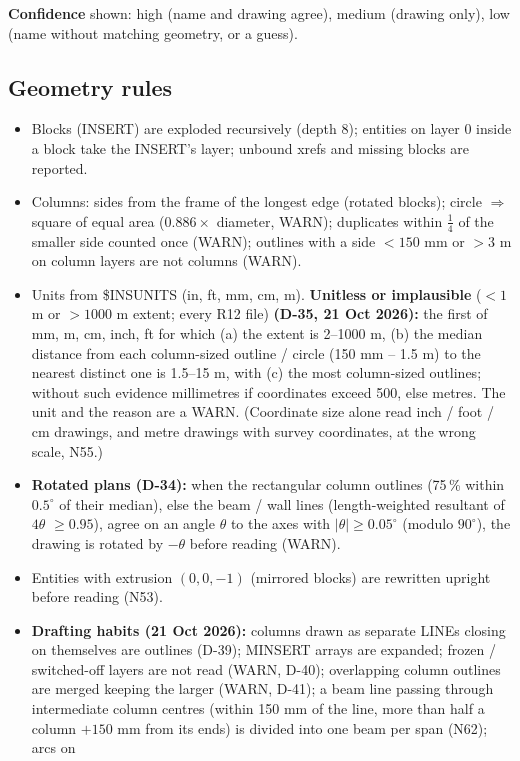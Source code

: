\documentclass[10pt,a4paper]{article}
\begin{document}
\textbf{Confidence} shown: high (name and drawing agree), medium (drawing only), low (name without matching
geometry, or a guess).

\subsection{Geometry rules}
\begin{itemize}
\item Blocks (INSERT) are exploded recursively (depth 8); entities on layer 0 inside a block take the INSERT's layer;
unbound xrefs and missing blocks are reported.
\item Columns: sides from the frame of the longest edge (rotated blocks); circle $\Rightarrow$ square of equal area
($0.886\times$ diameter, WARN); duplicates within $\tfrac14$ of the smaller side counted once (WARN); outlines with a
side $<150$ mm or $>3$ m on column layers are not columns (WARN).
\item Units from \$INSUNITS (in, ft, mm, cm, m). \textbf{Unitless or implausible} ($<1$ m or $>1000$ m extent; every
R12 file) \textbf{(D-35, 21 Oct 2026):} the first of mm, m, cm, inch, ft for which (a) the extent is 2--1000 m,
(b) the median distance from each column-sized outline / circle (150 mm -- 1.5 m) to the nearest distinct one is
1.5--15 m, with (c) the most column-sized outlines; without such evidence millimetres if coordinates exceed 500, else
metres. The unit and the reason are a WARN. (Coordinate size alone read inch / foot / cm drawings, and metre drawings
with survey coordinates, at the wrong scale, N55.)
\item \textbf{Rotated plans (D-34):} when the rectangular column outlines (75\,\% within $0.5^\circ$ of their median),
else the beam / wall lines (length-weighted resultant of $4\theta$ $\ge0.95$), agree on an angle $\theta$ to the axes
with $|\theta|\ge0.05^\circ$ (modulo $90^\circ$), the drawing is rotated by $-\theta$ before reading (WARN).
\item Entities with extrusion $(0,0,-1)$ (mirrored blocks) are rewritten upright before reading (N53).
\item \textbf{Drafting habits (21 Oct 2026):} columns drawn as separate LINEs closing on themselves are outlines
(D-39); MINSERT arrays are expanded; frozen / switched-off layers are not read (WARN, D-40); overlapping column
outlines are merged keeping the larger (WARN, D-41); a beam line passing through intermediate column centres (within
150 mm of the line, more than half a column $+150$ mm from its ends) is divided into one beam per span (N62); arcs on

\end{itemize}
\end{document}
